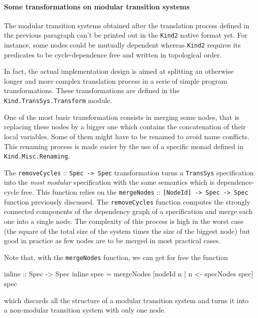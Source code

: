 \paragraph{Some transformations on modular transition systems} 

The modular transition systems obtained after the translation process defined in the previous paragraph can't be printed out in the \texttt{Kind2} native format yet. For instance, some nodes could be mutually dependent whereas \texttt{Kind2} requires its predicates to be cycle-dependence free and written in topological order.


In fact, the actual implementation design is aimed at splitting an otherwise longer and more complex translation process in a serie of simple program transformations. These transformations are defined in the \texttt{Kind.TransSys.Transform} module.

\bigskip

One of the most basic transformation consists in merging some nodes, that is replacing these nodes by a bigger one which contains the concatenation of their local variables. Some of them might have to be renamed to avoid name conflicts. This renaming process is made easier by the use of a specific monad defined in \texttt{Kind.Misc.Renaming}.

The \texttt{removeCycles} :: \texttt{Spec -> Spec} transformation turns a \texttt{TransSys} specification into the \textit{most modular} specification with the same semantics which is dependence-cycle free. This function relies on the \texttt{mergeNodes} :: \texttt{[NodeId] -> Spec -> Spec} function previously discussed. The \texttt{removeCycles} function computes the strongly connected components of the dependency graph of a specification and merge each one into a single node. The complexity of this process is high in the worst case (the square of the total size of the system times the size of the biggest node) but good in practice as few nodes are to be merged in most practical cases.

Note that, with the \texttt{mergeNodes} function, we can get for free the function
\begin{code}
inline :: Spec -> Spec
inline spec = mergeNodes [nodeId n | n <- specNodes spec] spec
\end{code}
which discards all the structure of a modular transition system and turns it into a non-modular transition system with only one node.

